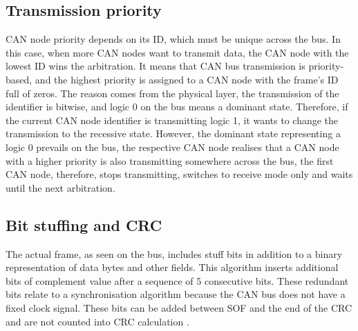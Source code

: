 \documentclass{ctuthesis}
\begin{document}
  \subsection{Transmission priority}
   CAN node priority depends on its ID, which must be unique across the bus. In this case, when more CAN nodes want to transmit data, the CAN node with the lowest ID wins the arbitration. It means that CAN bus transmission is priority-based, and the highest priority is assigned to a CAN node with the frame's ID full of zeros. The reason comes from the physical layer, the transmission of the identifier is bitwise, and logic 0 on the bus means a dominant state. Therefore, if the current CAN node identifier is transmitting logic 1, it wants to change the transmission to the recessive state. However, the dominant state representing a logic 0 prevails on the bus, the respective CAN node realises that a CAN node with a higher priority is also transmitting somewhere across the bus, the first CAN node, therefore, stops transmitting, switches to receive mode only and waits until the next arbitration.
  \subsection{Bit stuffing and CRC}
   The actual frame, as seen on the bus, includes stuff bits in addition to a binary representation of data bytes and other fields. This algorithm inserts additional bits of complement value after a sequence of 5 consecutive bits. These redundant bits relate to a synchronisation algorithm because the CAN bus does not have a fixed clock signal. These bits can be added between SOF and the end of the CRC and are not counted into CRC calculation \cite{can_crc}.
\end{document}
